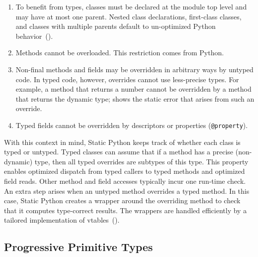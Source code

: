 \documentclass[english,cleveref,crc]{programming}
\newcommand{\SP}{Static Python}
\newcommand{\code}[1]{\texttt{#1}}
\begin{document}
\begin{enumerate}
  \item
    To benefit from types, classes must be declared at the module top level
    and may have at most one parent.
    Nested class declarations, first-class classes, and classes with
    multiple parents default to un-optimized Python behavior~().

  \item
    Methods cannot be overloaded.
    This restriction comes from Python.

  \item
    Non-final methods and fields may be overridden in arbitrary ways by untyped code.
    In typed code, however, overrides cannot use less-precise types.
    For example, a method that returns a number cannot be overridden by a method
    that returns the dynamic type;  shows the static error
    that arises from such an override.


  \item
    Typed fields cannot be overridden by descriptors or properties (\code{@property}).

\end{enumerate}
%
With this context in mind, \SP{} keeps track of whether each class is typed or untyped.
Typed classes can assume that if a method has a precise (non-dynamic)
type, then all typed overrides are subtypes of this type.
This property enables optimized dispatch from typed callers to typed methods
and optimized field reads.
Other method and field accesses typically incur one run-time check.
An extra step arises when an untyped method overrides a typed method.
In this case, \SP{} creates a wrapper around the overriding method to check
that it computes type-correct results.
The wrappers are handled efficiently by a tailored implementation of vtables~().


\subsection{Progressive Primitive Types}
\label{s:c-types}
\end{document}
